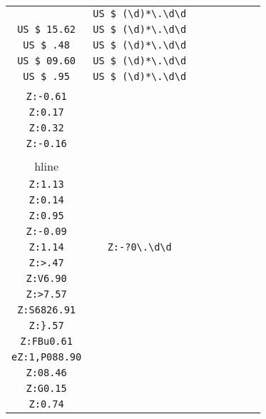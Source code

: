 \begin{longtable}{cccccccc}
\begin{tabular}{ll}
    \verb|US $ 9.03| & \verb|US $ (\d)*\.\d\d|\\
\verb|US $ 15.62| & \verb|US $ (\d)*\.\d\d|\\
\verb|US $ .48| & \verb|US $ (\d)*\.\d\d|\\
\verb|US $ 09.60| & \verb|US $ (\d)*\.\d\d|\\
\verb|US $ .95| & \verb|US $ (\d)*\.\d\d|
\end{tabular}
\\\midrule 
\begin{tabular}{l}
    \verb|Z:-0.53|\\
\verb|Z:-0.61|\\
\verb|Z:0.17|\\
\verb|Z:0.32|\\
\verb|Z:-0.16|\\
\\hline\\
\verb|Z:1.13|\\
\verb|Z:0.14|\\
\verb|Z:0.95|\\
\verb|Z:-0.09|\\
\verb|Z:1.14|
\end{tabular}

&
\verb|Z:-?0\.\d\d|
&

\begin{tabular}{l}
    \verb|Z:.(\d)*\.\d\d|\\
\verb|Z:>.47|\\
\verb|Z:V6.90|\\
\verb|Z:>7.57|\\
\verb|Z:S6826.91|\\
\verb|Z:}.57|
\end{tabular}

&

\begin{tabular}{l}
    \verb|(.)*Z:(.)*0(\d)*\.\d\d|\\
\verb|Z:FBu0.61|\\
\verb|eZ:1,P088.90|\\
\verb|Z:08.46|\\
\verb|Z:G0.15|\\
\verb|Z:0.74|
\end{tabular}

&


\end{longtable}
